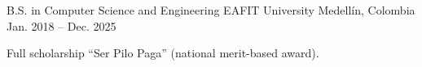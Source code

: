 
\begin{cventries}
  \cventry
    {B.S. in Computer Science and Engineering}
    {EAFIT University}
    {Medellín, Colombia}
    {Jan. 2018 -- Dec. 2025}
    {
      \begin{cvitems}
        \item {Full scholarship ``Ser Pilo Paga'' (national merit-based award).}
      \end{cvitems}
    }
\end{cventries}
